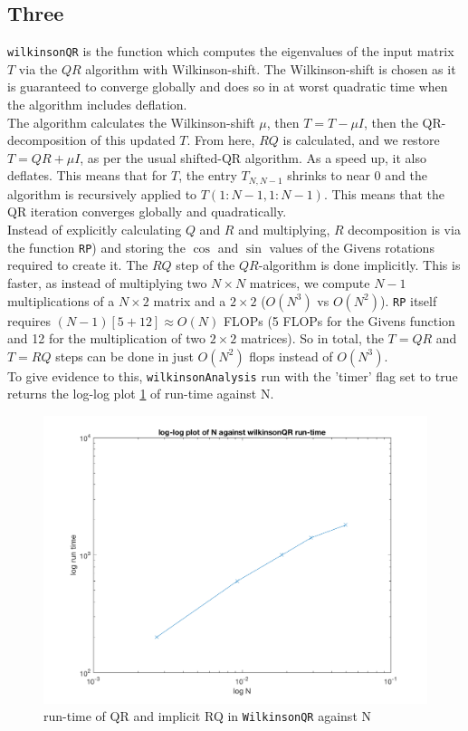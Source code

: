 \documentclass[paper=a4, fontsize=12pt]{scrartcl} %
\numberwithin{equation}{section}       %
\numberwithin{figure}{section}         %
\numberwithin{table}{section}          %
\begin{document}
\subsection{Three}
\texttt{wilkinsonQR} is the function which computes the eigenvalues of the input matrix $T$ via the $QR$ algorithm with Wilkinson-shift. The Wilkinson-shift is chosen as it is guaranteed to converge globally and does so in at worst quadratic time when the algorithm includes deflation\cite{2}. \\ 
\indent The algorithm calculates the Wilkinson-shift $\mu$, then $T = T - \mu I$, then the QR-decomposition of this updated $T$. From here, $RQ$ is calculated, and we restore $T = QR + \mu I$, as per the usual shifted-QR algorithm. As a speed up, it also deflates. This means that for $T$, the entry $T_{N, N-1}$ shrinks to near 0 and the algorithm is recursively applied to $T(1:N-1, 1:N-1)$. This means that the QR iteration converges globally and quadratically. \\
\indent Instead of explicitly calculating $Q$ and $R$ and multiplying, $R$ decomposition is via the function \texttt{RP}) and storing the $\cos$ and $\sin$ values of the Givens rotations required to create it. The $RQ$ step of the $QR$-algorithm is done implicitly. This is faster, as instead of multiplying two $N\times N$ matrices, we compute $N-1$ multiplications of a $N \times 2$ matrix and a $2\times 2$ ($O(N^3)$ vs $O(N^2)$). \texttt{RP} itself requires $(N-1)[5 + 12] \approx O(N)$ FLOPs (5 FLOPs for the Givens function and 12 for the multiplication of two $2\times 2$ matrices). So in total, the $T = QR$ and $T = RQ$ steps can be done in just $O(N^2)$ flops instead of $O(N^3)$. \\
To give evidence to this, \texttt{wilkinsonAnalysis} run with the 'timer' flag set to true returns the log-log plot \ref{fig:log-log_wilkinson} of run-time against N. 

\begin{center}
	\begin{figure}[h!]
	  \includegraphics[width=\linewidth]{log-log_wilkinson}
	  \caption{run-time of QR and implicit RQ in \texttt{WilkinsonQR} against N}
	  \label{fig:log-log_wilkinson}
	\end{figure}
\end{center}
\end{document}
